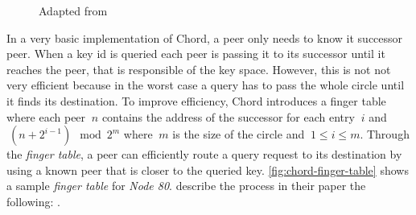 \begin{figure}
  \centering
	\caption{Adapted from \cite{chord}}
\label{fig:chord}
\end{figure}

In a very basic implementation of Chord, a peer only needs to know it successor peer. When a key id is queried each peer is passing it to its successor until it reaches the peer, that is responsible of the key space. However, this is not not very efficient because in the worst case a query has to pass the whole circle until it finds its destination. To improve efficiency, Chord introduces a finger table where each peer $\ n $ contains the address of the successor for each entry $\ i $ and $\ (n + 2^{i-1}) \mod 2^m $ where $\ m $ is the size of the circle and $\ 1 \leq i \leq m$. Through the \textit{finger table}, a peer can efficiently route a query request to its destination by using a known peer that is closer to the queried key. \vref{fig:chord-finger-table} shows a sample \textit{finger table} for \textit{Node 80}.
\citet[\S4.3]{chord} describe the process in their paper the following: .

